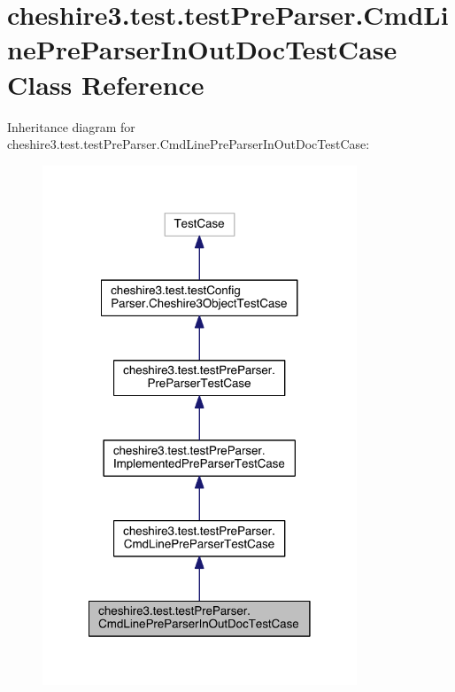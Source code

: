 \hypertarget{classcheshire3_1_1test_1_1test_pre_parser_1_1_cmd_line_pre_parser_in_out_doc_test_case}{\section{cheshire3.\-test.\-test\-Pre\-Parser.\-Cmd\-Line\-Pre\-Parser\-In\-Out\-Doc\-Test\-Case Class Reference}
\label{classcheshire3_1_1test_1_1test_pre_parser_1_1_cmd_line_pre_parser_in_out_doc_test_case}
}


Inheritance diagram for cheshire3.\-test.\-test\-Pre\-Parser.\-Cmd\-Line\-Pre\-Parser\-In\-Out\-Doc\-Test\-Case\-:
\nopagebreak
\begin{figure}[H]
\begin{center}
\leavevmode
\includegraphics[width=266pt]{classcheshire3_1_1test_1_1test_pre_parser_1_1_cmd_line_pre_parser_in_out_doc_test_case__inherit__graph}
\end{center}
\end{figure}


